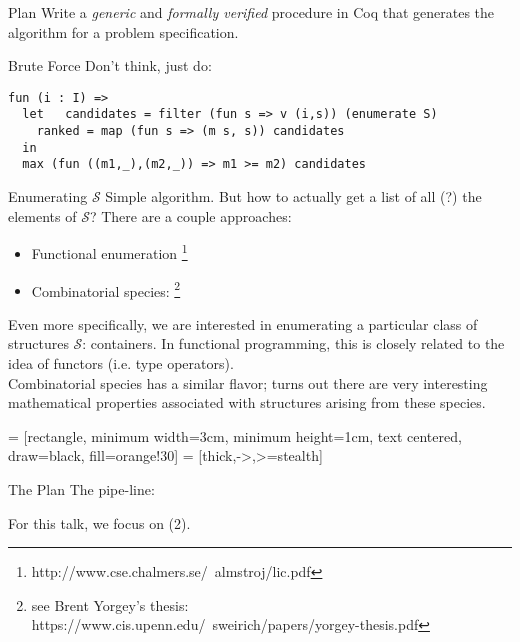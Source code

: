 \documentclass{beamer}
\newcommand{\irl}[1]{\mathtt{#1}}
\begin{document}
\begin{frame}{Plan}
Write a \emph{generic} and \emph{formally verified} procedure in Coq
that generates the algorithm for a problem specification. 
\end{frame}

\begin{frame}[fragile]{Brute Force}
Don't think, just do: 

\begin{verbatim}
fun (i : I) => 
  let	candidates = filter (fun s => v (i,s)) (enumerate S)
    ranked = map (fun s => (m s, s)) candidates
  in 
  max (fun ((m1,_),(m2,_)) => m1 >= m2) candidates
\end{verbatim}
\end{frame}

\begin{frame}{Enumerating $\mathcal{S}$}
Simple algorithm. But how to actually get a list of all (?) the elements of $\mathcal{S}$?
There are a couple approaches: \\
\begin{itemize}
\item Functional enumeration \footnote{http://www.cse.chalmers.se/~almstroj/lic.pdf}
\item Combinatorial species: \footnote{see Brent Yorgey's thesis: https://www.cis.upenn.edu/~sweirich/papers/yorgey-thesis.pdf}
\end{itemize}

Even more specifically, we are interested in enumerating a particular class of structures $\mathcal{S}$: 
containers. In functional programming, this is closely related to the idea of functors (i.e. type operators).\\

Combinatorial species has a similar flavor; turns out there are very interesting mathematical properties 
associated with structures arising from these species. 
\end{frame}

 = [rectangle, minimum width=3cm, minimum height=1cm, text centered, draw=black, fill=orange!30]
 = [thick,->,>=stealth]
\begin{frame}{The Plan}
The pipe-line:\\

For this talk, we focus on (2).
\end{frame}
\end{document}
